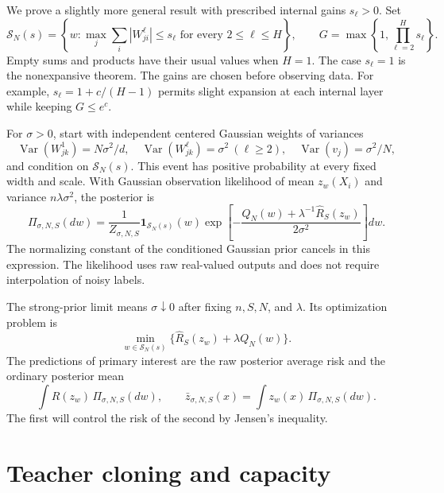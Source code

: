 \documentclass[11pt]{article}
\theoremstyle{definition}\newtheorem{definition}[theorem]{Definition}
\theoremstyle{remark}\newtheorem{remark}[theorem]{Remark}
\begin{document}
We prove a slightly more general result with prescribed internal gains $s_\ell>0$. Set
\begin{equation}
 \mathcal S_N(s)=\left\{w:
   \max_j\sum_i|W^\ell_{ji}|\leq s_\ell
       \text{ for every }2\leq\ell\leq H\right\},
 \qquad
 G=\max\left\{1,\prod_{\ell=2}^H s_\ell\right\}.
 \label{eq:support}
\end{equation}
Empty sums and products have their usual values when $H=1$. The case $s_\ell=1$ is the nonexpansive theorem. The gains are chosen before observing data. For example, $s_\ell=1+c/(H-1)$ permits slight expansion at each internal layer while keeping $G\leq e^c$.

For $\sigma>0$, start with independent centered Gaussian weights of variances
\[
 \operatorname{Var}(W^1_{jk})=N\sigma^2/d,
 \quad \operatorname{Var}(W^\ell_{jk})=\sigma^2\ (\ell\geq2),
 \quad \operatorname{Var}(v_j)=\sigma^2/N,
\]
and condition on $\mathcal S_N(s)$. This event has positive probability at every fixed width and scale. With Gaussian observation likelihood of mean $z_w(X_i)$ and variance $n\lambda\sigma^2$, the posterior is
\begin{equation}
 \Pi_{\sigma,N,S}(dw)=\frac1{Z_{\sigma,N,S}}
 \mathbf1_{\mathcal S_N(s)}(w)
 \exp\left[-\frac{Q_N(w)+\lambda^{-1}\widehat R_S(z_w)}{2\sigma^2}\right]dw.
 \label{eq:posterior}
\end{equation}
The normalizing constant of the conditioned Gaussian prior cancels in this expression. The likelihood uses raw real-valued outputs and does not require interpolation of noisy labels.

The strong-prior limit means $\sigma\downarrow0$ after fixing $n,S,N$, and $\lambda$. Its optimization problem is
\begin{equation}
 \min_{w\in\mathcal S_N(s)}
       \{\widehat R_S(z_w)+\lambda Q_N(w)\}.
 \label{eq:objective}
\end{equation}
The predictions of primary interest are the raw posterior average risk and the ordinary posterior mean
\[
 \int R(z_w)\,\Pi_{\sigma,N,S}(dw),
 \qquad
 \bar z_{\sigma,N,S}(x)=\int z_w(x)\,\Pi_{\sigma,N,S}(dw).
\]
The first will control the risk of the second by Jensen's inequality.

\section{Teacher cloning and capacity}
\end{document}
